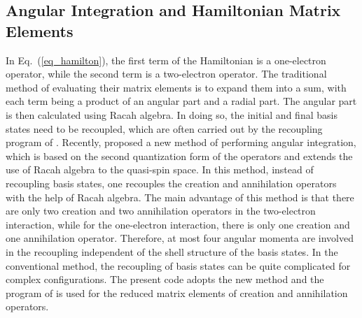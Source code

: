 \documentclass[preprint, floatfix, pra, showpacs, showkeys]{revtex4}
\begin{document}
\subsection{Angular Integration and Hamiltonian Matrix Elements}
In Eq.~(\ref{eq_hamilton}), the first term of the Hamiltonian is a
one-electron operator, while the second term is a two-electron operator. The
traditional method of evaluating their matrix elements is to expand them into a
sum, with each term being a product of an angular part and a radial part. The
angular part is then calculated using Racah algebra. In doing so, the initial
and final basis states need to be recoupled, which are often carried out by
the recoupling program of \textcite{grant76}. Recently, \textcite{gaigalas97}
proposed a new method of performing angular integration, which is based on the
second quantization form of the operators and extends the use of Racah algebra
to the quasi-spin space. In this method, instead of recoupling basis states,
one recouples the creation and annihilation operators with the help of Racah
algebra. The main advantage of this method 
is that there are only two creation and two annihilation operators in the
two-electron interaction, while for the one-electron interaction, there is
only one creation and one annihilation operator. Therefore, at most four
angular momenta 
are involved in the recoupling independent of the shell structure of the
basis states. In the conventional method, the recoupling of basis states can
be quite complicated for complex configurations. The present code adopts the
new method and the program of \textcite{gaigalas01} is used for the reduced
matrix elements of creation and annihilation operators.
\end{document}
